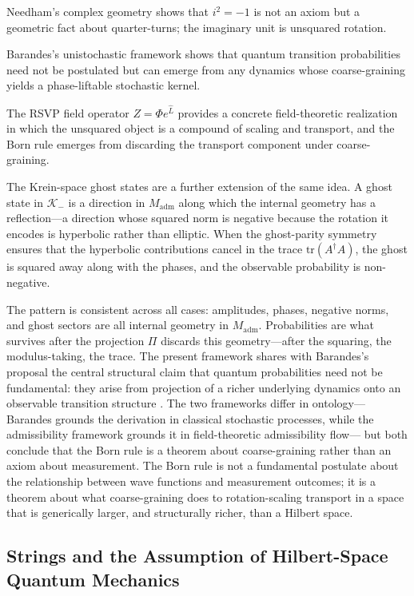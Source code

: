 \documentclass[12pt,a4paper]{article}
\theoremstyle{remark}
\begin{document}
Needham's complex geometry shows that $i^2 = -1$ is not an axiom but a
geometric fact about quarter-turns; the imaginary unit is unsquared rotation.

Barandes's unistochastic framework shows that quantum transition probabilities
need not be postulated but can emerge from any dynamics whose coarse-graining
yields a phase-liftable stochastic kernel.

The RSVP field operator $Z = \Phi e^{\widehat{L}}$ provides a concrete
field-theoretic realization in which the unsquared object is a compound of
scaling and transport, and the Born rule emerges from discarding the
transport component under coarse-graining.

The Krein-space ghost states are a further extension of the same idea. A
ghost state in $\mathcal{K}_-$ is a direction in $M_{\mathrm{adm}}$ along
which the internal geometry has a reflection---a direction whose squared
norm is negative because the rotation it encodes is hyperbolic rather than
elliptic. When the ghost-parity symmetry ensures that the hyperbolic
contributions cancel in the trace $\mathrm{tr}(A^\dagger A)$, the ghost is
squared away along with the phases, and the observable probability is
non-negative.

The pattern is consistent across all cases: amplitudes, phases, negative
norms, and ghost sectors are all internal geometry in $M_{\mathrm{adm}}$.
Probabilities are what survives after the projection $\Pi$ discards this
geometry---after the squaring, the modulus-taking, the trace. The present
framework shares with Barandes's proposal the central structural claim that
quantum probabilities need not be fundamental: they arise from projection of
a richer underlying dynamics onto an observable transition structure
\cite{barandes2023,barandes2024}. The two frameworks differ in ontology---
Barandes grounds the derivation in classical stochastic processes, while the
admissibility framework grounds it in field-theoretic admissibility flow---
but both conclude that the Born rule is a theorem about coarse-graining
rather than an axiom about measurement. The Born rule is not a fundamental
postulate about the relationship between wave functions and measurement
outcomes; it is a theorem about what coarse-graining does to
rotation-scaling transport in a space that is generically larger, and
structurally richer, than a Hilbert space.

\subsection{Strings and the Assumption of Hilbert-Space Quantum Mechanics}
\end{document}
